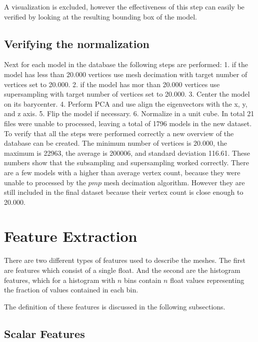 \documentclass{bigdata}
\begin{document}
A visualization is excluded, however the effectiveness of this step can easily be verified by looking at the resulting bounding box of the model.

\subsection{Verifying the normalization}
Next for each model in the database the following steps are performed: 
1. if the model has less than 20.000 vertices use mesh decimation with target number of vertices set to 20.000.
2. if the model has mor than 20.000 vertices use supersampling with target number of vertices set to 20.000.
3. Center the model on its barycenter.
4. Perform PCA and use align the eigenvectors with the x, y, and z axis.
5. Flip the model if necessary.
6. Normalize in a unit cube.
In total 21 files were unable to processed, leaving a total of 1796 models in the new dataset. To verify that all the steps were performed correctly a new overview of the database can be created. The minimum number of vertices is 20.000, the maximum is 22963, the average is 200006, and standard deviation 116.61. These numbers show that the subsampling and supersampling worked correctly. There are a few models with a higher than average vertex count, because they were unable to processed by the $pmp$ mesh decimation algorithm. However they are still included in the final dataset because their vertex count is close enough to 20.000.

\section{Feature Extraction}

There are two different types of features used to describe the meshes. The first are  features which consist of a single float. And the second are the histogram features, which for a histogram with $n$ bins contain $n$ float values representing the fraction of values contained in each bin. 

The definition of these features is discussed in the following subsections.
\subsection{Scalar Features}
\end{document}
